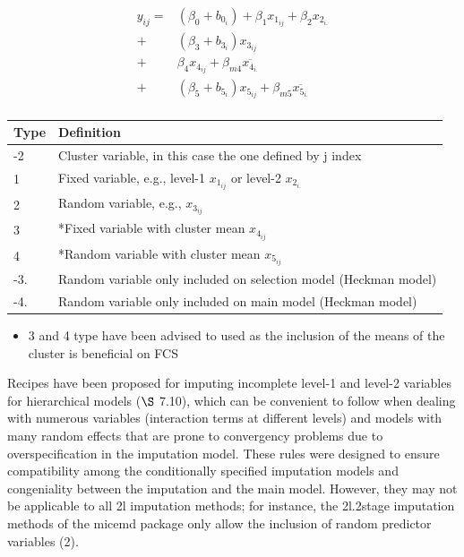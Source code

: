 \documentclass[
  article]{jss}
\providecommand{\tightlist}{%
  \setlength{\itemsep}{0pt}\setlength{\parskip}{0pt}}\usepackage{longtable,booktabs,array}
\begin{document}
\begin{align}
y_{ij} =& (\beta_0 + b_{0_i})+ \beta_1x_{1_{ij}}+\beta_2x_{2_{i.}} \nonumber \\
+& (\beta_3 +  b_{3_i})x_{3_{ij}} \nonumber \\
+& \beta_4x_{4_{ij}} + \beta_{m4}\overline{x_{4_{i.}}}\nonumber \\
+& (\beta_5 +  b_{5_i})x_{5_{ij}} +\beta_{m5}\overline{x_{5_{i.}}}\nonumber \\
\end{align}

\begin{tabular}{ll}
     \toprule
Type & Definition \\
  \midrule
-2  & Cluster variable, in this case the one defined by j index  \\
 1  & Fixed variable, e.g., level-1  $x_{1_{ij}}$ or  level-2 $x_{2_{i.}}$ \\
 2  & Random variable, e.g., $x_{3_{ij}}$\\
 3  & *Fixed variable with cluster mean $x_{4_{ij}}$\\
 4  & *Random variable with cluster mean $x_{5_{ij}}$\\
-3. & Random variable only included on selection model (Heckman model)\\
-4. & Random variable only included on main model (Heckman model)\\
      \bottomrule
\end{tabular}

\begin{itemize}
\tightlist
\item
  3 and 4 type have been advised to used as the inclusion of the means
  of the cluster is beneficial on FCS \cite{mistler2017}
\end{itemize}

Recipes have been proposed for imputing incomplete level-1 and level-2
variables for hierarchical models \cite{buur18} (\(\S\) 7.10), which can
be convenient to follow when dealing with numerous variables
(interaction terms at different levels) and models with many random
effects that are prone to convergency problems due to overspecification
in the imputation model. These rules were designed to ensure
compatibility among the conditionally specified imputation models and
congeniality between the imputation and the main model. However, they
may not be applicable to all 2l imputation methods; for instance, the
2l.2stage imputation methods of the micemd package only allow the
inclusion of random predictor variables (2).
\end{document}
